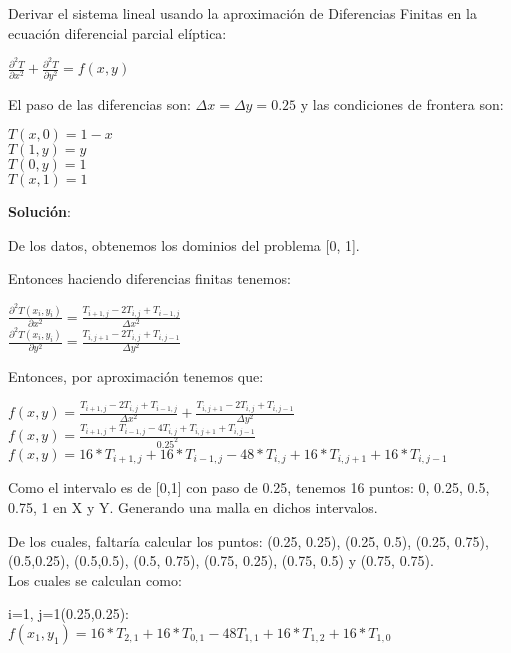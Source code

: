 Derivar el sistema lineal usando la aproximación de Diferencias Finitas en la ecuación diferencial parcial elíptica:
\begin{center}
  $ \frac{\partial^2 T}{\partial x^2} + \frac{\partial^2 T}{\partial y^2} = f(x,y)$    
\end{center}

El paso de las diferencias son: $ \Delta x = \Delta y = 0.25 $ y las condiciones de frontera son:
\begin{center}
  $T(x,0) = 1-x$\\
  $T(1,y)=y$\\
  $T(0,y)=1$\\
  $T(x,1)=1$    
\end{center}

\textbf{Solución}:

De los datos, obtenemos los dominios del problema [0, 1].

Entonces haciendo diferencias finitas tenemos:
\begin{center}
  $ \frac{\partial^2 T(x_i , y_i)}{\partial x^2} = \frac{T_{i+1,j} - 2 T_{i,j} + T_{i-1,j}}{\Delta x ^2}$\\
  $ \frac{\partial^2 T(x_i , y_i)}{\partial y^2} = \frac{T_{i,j+1} - 2 T_{i,j} + T_{i,j-1}}{\Delta y ^2}$\\
\end{center}

Entonces, por aproximación tenemos que:
\begin{center}
  $f(x,y) = \frac{T_{i+1,j} - 2 T_{i,j} + T_{i-1,j}}{\Delta x ^2} + \frac{T_{i,j+1} - 2 T_{i,j} + T_{i,j-1}}{\Delta y ^2}$\\
  $f(x,y) = \frac{T_{i+1,j} + T_{i-1,j} - 4 T_{i,j} + T_{i,j+1} + T_{i,j-1}}{0.25 ^2} $\\
  $f(x,y) = 16*T_{i+1,j} + 16*T_{i-1,j} - 48* T_{i,j} + 16*T_{i,j+1} + 16*T_{i,j-1} $\\
\end{center}

Como el intervalo es de [0,1] con paso de 0.25, tenemos 16 puntos: 0, 0.25, 0.5, 0.75, 1 en X y Y. Generando una malla en dichos intervalos.

De los cuales, faltaría calcular los puntos: (0.25, 0.25), (0.25, 0.5), (0.25, 0.75), (0.5,0.25), (0.5,0.5), (0.5, 0.75), (0.75, 0.25), (0.75, 0.5) y (0.75, 0.75).\\

Los cuales se calculan como:

i=1, j=1(0.25,0.25):\\
$f(x_1,y_1) = 16*T_{2,1} + 16*T_{0,1} - 48 T_{1,1} + 16*T_{1,2} + 16*T_{1,0}$\\

